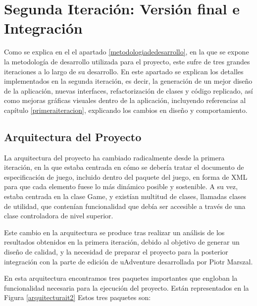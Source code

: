 \chapter{Segunda Iteración: Versión final e Integración}
\label{it2}

Como se explica en el el apartado \ref{metodologiadedesarrollo}, en la que se expone la metodología de desarrollo utilizada para el proyecto, este sufre de tres grandes iteraciones a lo largo de su desarrollo. En este apartado se explican los detalles implementados en la segunda iteración, es decir, la generación de un mejor diseño de la aplicación, nuevas interfaces, refactorización de clases y código replicado, así como mejoras gráficas visuales dentro de la aplicación, incluyendo referencias al capítulo \ref{primeraiteracion}, explicando los cambios en diseño y comportamiento.

\section{Arquitectura del Proyecto}
\label{it2arquitectura}

La arquitectura del proyecto ha cambiado radicalmente desde la primera iteración, en la que estaba centrada en cómo se debería tratar el documento de especificación de juego, incluido dentro del paquete del juego, en forma de XML para que cada elemento fuese lo más dinámico posible y sostenible. A su vez, estaba centrada en la clase Game, y existían multitud de clases, llamadas clases de utilidad, que contenían funcionalidad que debía ser accesible a través de una clase controladora de nivel superior.

Este cambio en la arquitectura se produce tras realizar un análisis de los resultados obtenidos en la primera iteración, debido al objetivo de generar un diseño de calidad, y la necesidad de preparar el proyecto para la posterior integración con la parte de edición de uAdventure desarrollada por Piotr Marszal.

En esta arquitectura encontramos tres paquetes importantes que engloban la funcionalidad necesaria para la ejecución del proyecto. Están representados en la Figura \ref{arquitecturait2} Estos tres paquetes son:

